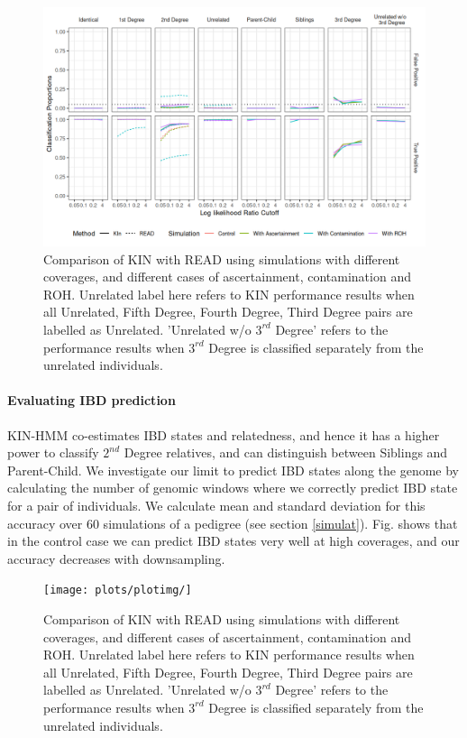 \documentclass[12pt, letterpaper]{article}
\begin{document}
\begin{figure}[h!]
    \includegraphics[width=16cm]{plots/plotimg/comparison_plot.png}
    \centering
    \caption{Comparison of KIN with READ using simulations with different coverages, and different cases of ascertainment, contamination and ROH. Unrelated label here refers to KIN performance results when all Unrelated, Fifth Degree, Fourth Degree, Third Degree pairs are labelled as Unrelated. 'Unrelated w/o $3^{rd}$ Degree' refers to the performance results when $3^{rd}$ Degree is classified separately from the unrelated individuals.}
    \label{fig4:Comparison_READ_KIN}
\end{figure}

\paragraph{Evaluating IBD prediction}
KIN-HMM co-estimates IBD states and relatedness, and hence it has a higher power to classify $2^{nd}$ Degree relatives, and can distinguish between Siblings and Parent-Child. We investigate our limit to predict IBD states along the genome by calculating the number of genomic windows where we correctly  predict IBD state for a pair of individuals. We calculate mean and standard deviation for this accuracy over 60 simulations of a pedigree (see section \ref{simulat}). Fig. shows that in the control case we can predict IBD states very well at high coverages, and our accuracy decreases with downsampling.


\begin{figure}[h!]
    \texttt{[image: plots/plotimg/]}
    \centering
    \caption{Comparison of KIN with READ using simulations with different coverages, and different cases of ascertainment, contamination and ROH. Unrelated label here refers to KIN performance results when all Unrelated, Fifth Degree, Fourth Degree, Third Degree pairs are labelled as Unrelated. 'Unrelated w/o $3^{rd}$ Degree' refers to the performance results when $3^{rd}$ Degree is classified separately from the unrelated individuals.}
    \label{fig4:Comparison_READ_KIN}
\end{figure}
\end{document}
